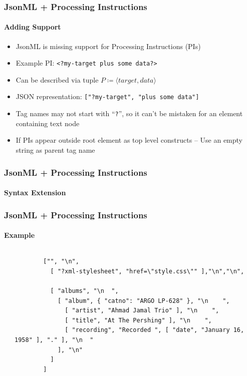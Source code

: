 \documentclass[
    alternativetitlepage=alternativ,
    cornerlogo=hgi_nds_logo2,
    sectionoverview,
]{rubpresentation}
\begin{document}
\begin{frame}
  \frametitle{JsonML + Processing Instructions}
  \framesubtitle{Adding Support}
  \begin{itemize}
    \item{} JsonML is missing support for Processing Instructions (PIs)
    \item{} Example PI: \texttt{<?my-target plus some data?>}
    \item{} Can be described via tuple $P \coloneqq \langle target, data \rangle$
    \item{} JSON representation: \texttt{["?my-target", "plus some data"]}
    \item{} Tag names may not start with \enquote{\texttt{?}}, so it can't be
      mistaken for an element containing text node
    \item{} If PIs appear outside root element as top level constructs -- Use
      an empty string as parent tag name
  \end{itemize}
\end{frame}

\begin{frame}[fragile]
  \frametitle{JsonML + Processing Instructions}
  \framesubtitle{Syntax Extension}
  \begin{center}
    
  \end{center}
\end{frame}

\begin{frame}[fragile]
  \frametitle{JsonML + Processing Instructions}
  \framesubtitle{Example}
  \begin{columns}[t]
    \begin{column}{0.45\textwidth}
      \inputminted[breaklines,autogobble,fontsize=\tiny]{xml}{thesis/xmltree.xml}
    \end{column}
    \begin{column}{0.55\textwidth}
      \begin{verbatim}
        ["", "\n",
          [ "?xml-stylesheet", "href=\"style.css\"" ],"\n","\n",

          [ "albums", "\n  ",
            [ "album", { "catno": "ARGO LP-628" }, "\n    ",
              [ "artist", "Ahmad Jamal Trio" ], "\n    ",
              [ "title", "At The Pershing" ], "\n    ",
              [ "recording", "Recorded ", [ "date", "January 16, 1958" ], "." ], "\n  "
            ], "\n"
          ]
        ]
      \end{verbatim}
    \end{column}
  \end{columns}
\end{frame}
\end{document}
